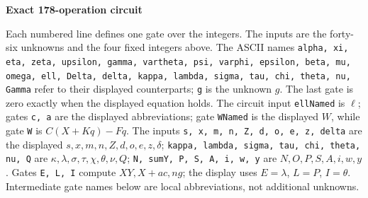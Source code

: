 \documentclass[10pt]{article}
\begin{document}
\clearpage
\begin{center}{\large\bfseries Exact 178-operation circuit}\end{center}
Each numbered line defines one gate over the integers. The inputs are the
forty-six unknowns and the four fixed integers above. The ASCII names
\texttt{alpha, xi, eta, zeta, upsilon, gamma, vartheta, psi, varphi, epsilon, beta, mu, omega, ell, Delta, delta, kappa, lambda, sigma, tau, chi, theta, nu, Gamma}
refer to their displayed counterparts; \texttt{g} is the unknown $g$. The last
gate is zero exactly when the displayed equation holds. The circuit input
\texttt{ellNamed} is $\ell$; gates \texttt{c, a} are the displayed abbreviations; gate \texttt{WNamed} is the
displayed $W$, while gate \texttt{W} is $C(X+Kq)-Fq$. The inputs
\texttt{s, x, m, n, Z, d, o, e, z, delta} are the displayed
$s,x,m,n,Z,d,o,e,z,\delta$; \texttt{kappa, lambda, sigma, tau, chi, theta, nu, Q}
are $\kappa,\lambda,\sigma,\tau,\chi,\theta,\nu,Q$; \texttt{N, sumY, P, S, A, i, w, y}
are $N,O,P,S,A,i,w,y$. Gates \texttt{E, L, I} compute $XY,X+ac,ng$;
the display uses $E=\lambda$, $L=P$, $I=\theta$. Intermediate gate
names below are local abbreviations, not additional unknowns.
\end{document}
